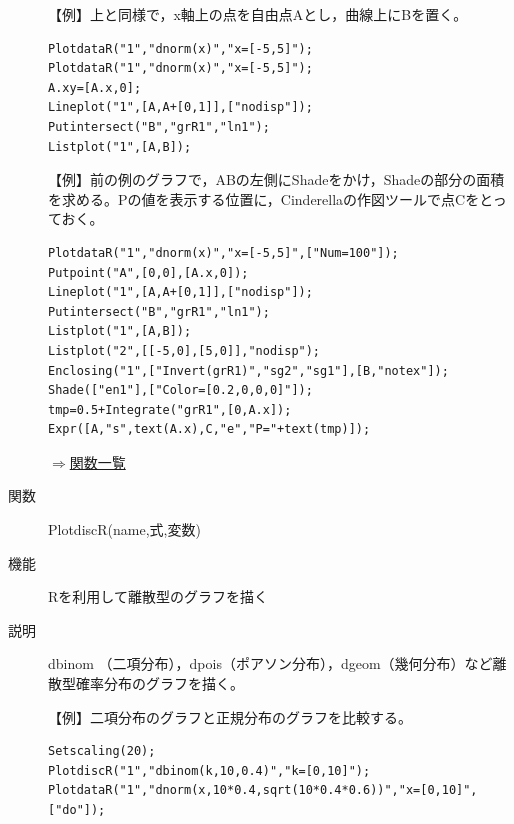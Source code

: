\documentclass[papersize,a4paper,10pt,uplatex]{jsarticle}
\begin{document}
\begin{description}
\vspace{\baselineskip}
【例】上と同様で，x軸上の点を自由点Aとし，曲線上にBを置く。
\begin{verbatim}
PlotdataR("1","dnorm(x)","x=[-5,5]");
PlotdataR("1","dnorm(x)","x=[-5,5]");
A.xy=[A.x,0];
Lineplot("1",[A,A+[0,1]],["nodisp"]);
Putintersect("B","grR1","ln1");
Listplot("1",[A,B]);
\end{verbatim}
\vspace{\baselineskip}
【例】前の例のグラフで，ABの左側にShadeをかけ，Shadeの部分の面積を求める。Pの値を表示する位置に，Cinderellaの作図ツールで点Cをとっておく。
\begin{verbatim}
PlotdataR("1","dnorm(x)","x=[-5,5]",["Num=100"]);
Putpoint("A",[0,0],[A.x,0]);
Lineplot("1",[A,A+[0,1]],["nodisp"]);
Putintersect("B","grR1","ln1");
Listplot("1",[A,B]);
Listplot("2",[[-5,0],[5,0]],"nodisp");
Enclosing("1",["Invert(grR1)","sg2","sg1"],[B,"notex"]);
Shade(["en1"],["Color=[0.2,0,0,0]"]);
tmp=0.5+Integrate("grR1",[0,A.x]);
Expr([A,"s",text(A.x),C,"e","P="+text(tmp)]);
\end{verbatim}

\begin{center}  \end{center}

\vspace{\baselineskip}
\begin{flushright}\hyperlink{functionlist}{$\Rightarrow$関数一覧}\end{flushright}

\vspace{\baselineskip}
\hypertarget{plotdiscr}{}
\item[関数]PlotdiscR(name,式,変数)
\item[機能]Rを利用して離散型のグラフを描く
\item[説明]dbinom （二項分布），dpois（ポアソン分布），dgeom（幾何分布）など離散型確率分布のグラフを描く。

\vspace{\baselineskip}
【例】二項分布のグラフと正規分布のグラフを比較する。
\begin{verbatim}
Setscaling(20);
PlotdiscR("1","dbinom(k,10,0.4)","k=[0,10]");
PlotdataR("1","dnorm(x,10*0.4,sqrt(10*0.4*0.6))","x=[0,10]",["do"]);
\end{verbatim}
\vspace{\baselineskip}
\begin{center} \scalebox{0.9}{} \end{center}


\end{description}
\end{document}

